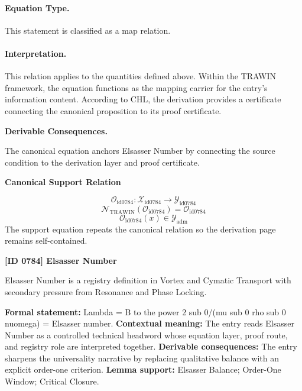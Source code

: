 \paragraph{Equation Type.}
This statement is classified as a map relation.

\paragraph{Interpretation.}
This relation applies to the quantities defined above. Within the TRAWIN framework, the equation functions as the mapping carrier for the entry’s information content. According to CHL, the derivation provides a certificate connecting the canonical proposition to its proof certificate.

\par\vspace{0.35em}
\noindent\textbf{Derivable Consequences.}\quad
\begingroup
\footnotesize
\raggedright
The canonical equation anchors Elsasser Number by connecting the source condition to the derivation layer and proof certificate.
\par\endgroup

\noindent\textbf{Canonical Support Relation}\par
\[
\mathcal{O}_{\mathrm{id0784}}:\mathcal{X}_{\mathrm{id0784}}\longrightarrow\mathcal{Y}_{\mathrm{id0784}}
\]
\[
\mathcal{N}_{\mathrm{TRAWIN}}(\mathcal{O}_{\mathrm{id0784}})=\mathcal{O}_{\mathrm{id0784}}
\]
\[
\mathcal{O}_{\mathrm{id0784}}(x)\in\mathcal{Y}_{\mathrm{adm}}
\]
\noindent The support equation repeats the canonical relation so the derivation page remains self-contained.\par

\clearpage
\noindent\textbf{[ID 0784] Elsasser Number}\par
\vspace{0.35em}
\begingroup\small
{}
Elsasser Number is a registry definition in Vortex and Cymatic Transport with secondary pressure from Resonance and Phase Locking.

\begingroup\footnotesize\setlength{\emergencystretch}{3em}\sloppy
\textbf{Formal statement:} Lambda = B to the power 2 sub 0/(mu sub 0 rho sub 0 nuomega) = Elsasser number. \textbf{Contextual meaning:} The entry reads Elsasser Number as a controlled technical headword whose equation layer, proof route, and registry role are interpreted together. \textbf{Derivable consequences:} The entry sharpens the universality narrative by replacing qualitative balance with an explicit order-one criterion. \textbf{Lemma support:} Elsasser Balance; Order-One Window; Critical Closure.\par
\endgroup

